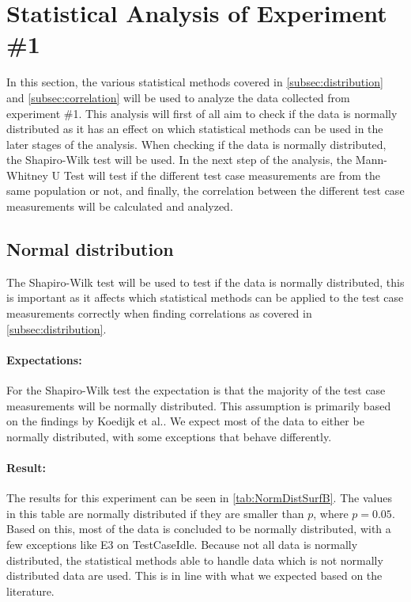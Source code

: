 \section{Statistical Analysis of Experiment \#1}\label{sec:Stat1}

In this section, the various statistical methods covered in \cref{subsec:distribution} and \cref{subsec:correlation} will be used to analyze the data collected from experiment \#1. This analysis will first of all aim to check if the data is normally distributed as it has an effect on which statistical methods can be used in the later stages of the analysis. When checking if the data is normally distributed, the Shapiro-Wilk test\cite{razali2011power} will be used. In the next step of the analysis, the Mann-Whitney U Test\cite{mann1947test} will test if the different test case measurements are from the same population or not, and finally, the correlation between the different test case measurements will be calculated and analyzed.

\subsection{Normal distribution}\label{subsec:NormalDist1}
The Shapiro-Wilk test will be used to test if the data is normally distributed, this is important as it affects which statistical methods can be applied to the test case measurements correctly when finding correlations as covered in \cref{subsec:distribution}. 

\paragraph{Expectations:} For the Shapiro-Wilk test the expectation is that the majority of the test case measurements will be normally distributed. This assumption is primarily based on the findings by Koedijk et al.\cite{Koedijk2022diff}. We expect most of the data to either be normally distributed, with some exceptions that behave differently.

\paragraph{Result:} The results for this experiment can be seen in \cref{tab:NormDistSurfB}. The values in this table are normally distributed if they are smaller than $p$, where $p = 0.05$. Based on this, most of the data is concluded to be normally distributed, with a few exceptions like E3 on TestCaseIdle. Because not all data is normally distributed, the statistical methods able to handle data which is not normally distributed data are used. This is in line with what we expected based on the literature.

